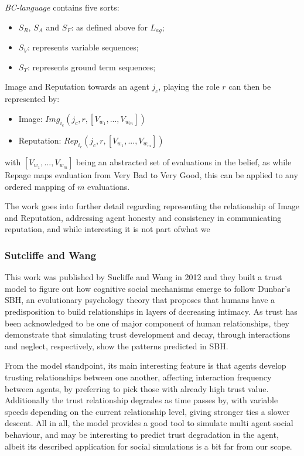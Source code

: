 \textit{\textit{BC}-language} contains five sorts:
\begin{itemize}
	\item $S_R$, $S_A$ and $S_F$: as defined above for $L_{ag}$;
	\item $S_V$: represents variable sequences;
	\item $S_T$: represents ground term sequences;
\end{itemize}

Image and Reputation towards an agent $j_c$, playing the role $r$ can then be represented by:
\begin{itemize}
	\item Image: $Img_{i_c} (j_c, r, [V_{w_1}, ..., V_{w_m}])$
	\item Reputation: $Rep_{i_c} (j_c, r, [V_{w_1}, ..., V_{w_m}])$
\end{itemize}
with $[V_{w_1}, ..., V_{w_m}]$ being an abstracted set of evaluations in the belief, as while Repage maps evaluation from Very Bad to Very Good, this can be applied to any ordered mapping of $m$ evaluations.

The work goes into further detail regarding representing the relationship of Image and Reputation, addressing agent honesty and consistency in communicating reputation, and while interesting it is not part ofwhat we 

\subsubsection{Sutcliffe and Wang}
\label{subsubsec:Related work:Sutcliffe and Wang}
This work was published by Sucliffe and Wang in 2012\cite{Sutcliffe2012} and they built a trust model to figure out how cognitive social mechanisms emerge to follow Dunbar's \ac{SBH}\cite{Dunbar1998}, an evolutionary psychology theory that proposes that humans have a predisposition to build relationships in layers of decreasing intimacy. As trust has been acknowledged to be one of major component of human relationships, they demonstrate that simulating trust development and decay, through interactions and neglect, respectively, show the patterns predicted in \ac{SBH}.

From the model standpoint, its main interesting feature is that agents develop trusting relationships between one another, affecting interaction frequency between agents, by preferring to pick those with already high trust value. Additionally the trust relationship degrades as time passes by, with variable speeds depending on the current relationship level, giving stronger ties a slower descent. All in all, the model provides a good tool to simulate multi agent social behaviour, and may be interesting to predict trust degradation in the agent, albeit its described application for social simulations is a bit far from our scope.

